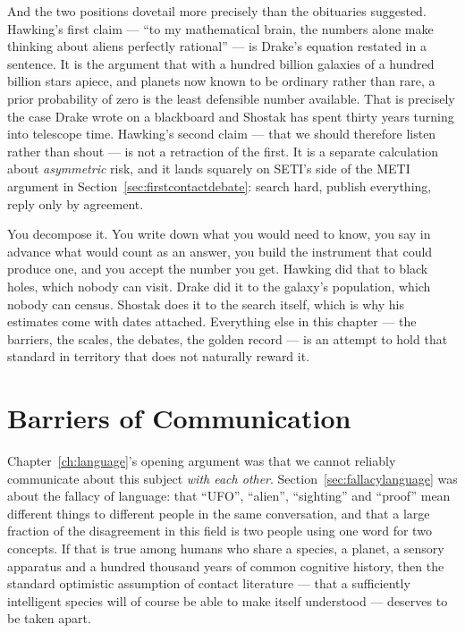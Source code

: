 And the two positions dovetail more precisely than the obituaries suggested. Hawking's first claim ---
``to my mathematical brain, the numbers alone make thinking about aliens perfectly rational'' --- is
Drake's equation restated in a sentence. It is the argument that with a hundred billion galaxies of a
hundred billion stars apiece, and planets now known to be ordinary rather than rare, a prior
probability of zero is the least defensible number available. That is precisely the case Drake wrote on
a blackboard and Shostak has spent thirty years turning into telescope time. Hawking's second claim
--- that we should therefore listen rather than shout --- is not a retraction of the first. It is a
separate calculation about \emph{asymmetric} risk, and it lands squarely on SETI's side of the METI
argument in Section~\ref{sec:firstcontactdebate}: search hard, publish everything, reply only by
agreement.

 You decompose it. You write down what you would need to know, you say in advance what
would count as an answer, you build the instrument that could produce one, and you accept the number
you get. Hawking did that to black holes, which nobody can visit. Drake did it to the galaxy's
population, which nobody can census. Shostak does it to the search itself, which is why his estimates
come with dates attached. Everything else in this chapter --- the barriers, the scales, the debates,
the golden record --- is an attempt to hold that standard in territory that does not naturally reward
it.

\section{Barriers of Communication}\label{sec:barrierscommunication}

Chapter~\ref{ch:language}'s opening argument was that we cannot reliably communicate about this
subject \emph{with each other}. Section~\ref{sec:fallacylanguage} was about the fallacy of language: that ``UFO'',
``alien'', ``sighting'' and ``proof'' mean different things to different people in the same
conversation, and that a large fraction of the disagreement in this field is two people using one
word for two concepts. If that is true among humans who share a species, a planet, a sensory
apparatus and a hundred thousand years of common cognitive history, then the standard optimistic
assumption of contact literature --- that a sufficiently intelligent species will of course be able
to make itself understood --- deserves to be taken apart.

